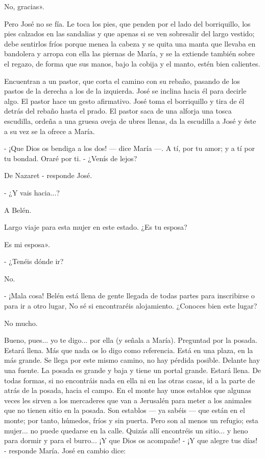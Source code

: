 \documentclass[12pt]{book} %
\begin{document}
No, gracias». 

Pero José no se fía. Le toca los pies, que penden por el lado del borriquillo, los pies calzados en las sandalias y que apenas si se ven sobresalir del largo vestido; debe sentirlos fríos porque menea la cabeza y se quita una manta que llevaba en bandolera y arropa con ella las piernas de María, y se la extiende también sobre el regazo, de forma que sus manos, bajo la cobija y el manto, estén bien calientes. 

Encuentran a un pastor, que corta el camino con su rebaño, pasando de los pastos de la derecha a los de la izquierda. José se inclina hacia él para decirle algo. El pastor hace un gesto afirmativo. José toma el borriquillo y tira de él detrás del rebaño hasta el prado. El pastor saca de una alforja una tosca escudilla, ordeña a una gruesa oveja de ubres llenas, da la escudilla a José y éste a su vez se la ofrece a María. 

- ¡Que Dios os bendiga a los dos! — dice María —. A tí, por tu amor; y a tí por tu bondad. Oraré por ti. - ¿Venís de lejos? 

De Nazaret - responde José. 

- ¿Y vais hacia...? 

A Belén. 

Largo viaje para esta mujer en este estado. ¿Es tu esposa? 

Es mi esposa». 

- ¿Tenéis dónde ir? 

No. 

- ¡Mala cosa! Belén está llena de gente llegada de todas partes para inscribirse o para ir a otro lugar, No sé si encontraréis alojamiento. ¿Conoces bien este lugar? 

No mucho. 

Bueno, pues... yo te digo... por ella (y señala a María). Preguntad por la posada. Estará llena. Más que nada os lo digo como referencia. Está en una plaza, en la más grande. Se llega por este mismo camino, no hay pérdida posible. Delante hay una fuente. La posada es grande y baja y tiene un portal grande. Estará llena. De todas formas, si no encontráis nada en ella ni en las otras casas, id a la parte de atrás de la posada, hacia el campo. En el monte hay unos establos que algunas veces les sirven a los mercaderes que van a Jerusalén para meter a los animales que no tienen sitio en la posada. Son establos — ya sabéis — que están en el monte; por tanto, húmedos, fríos y sin puerta. Pero son al menos un refugio; esta mujer... no puede quedarse en la calle. Quizás allí encontréis un sitio... y heno para dormir y para el burro... ¡Y que Dios os acompañe! - ¡Y que alegre tus días! - responde María. José en cambio dice: 
\end{document}
